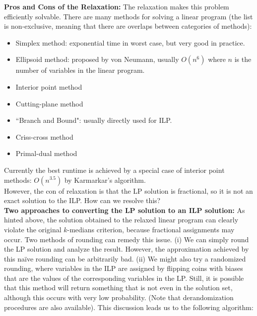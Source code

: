 \newpage

\noindent\textbf{Pros and Cons of the Relaxation:} The relaxation makes this problem efficiently solvable. There are many methods for solving a linear program (the list is non-exclusive, meaning that there are overlaps between categories of methods):

\begin{itemize}
\item Simplex method: exponential time in worst case, but very good in practice.

\item Ellipsoid method: proposed by von Neumann, usually $O(n^6)$ where $n$ is the number of variables in the linear program.
\item Interior point method
\item Cutting-plane method
\item ``Branch and Bound": usually directly used for ILP.
\item Criss-cross method
\item Primal-dual method
\end{itemize}

Currently the best runtime is achieved by a special case of interior point methods: $O(n^{3.5})$ by Karmarkar's algorithm. \\

However, the con of relaxation is that the LP solution is fractional, so it is not an exact solution to the ILP. How can we resolve this? \\

\noindent\textbf{Two approaches to converting the LP solution to an ILP solution: }As hinted above, the solution obtained to the relaxed linear program can clearly violate the original $k$-medians criterion, because fractional assignments may occur. Two methods of rounding can remedy this issue. (i) We can simply round the LP solution and analyze the result. However, the approximation achieved by this na\"ive rounding can be arbitrarily bad. (ii) We might also try a randomized rounding, where variables in the ILP are assigned by flipping coins with biases that are the values of the corresponding variables in the LP. Still, it is possible that this method will return something that is not even in the solution set, although this occurs with very low probability. (Note that derandomization procedures are also available). This discussion leads us to the following algorithm:

